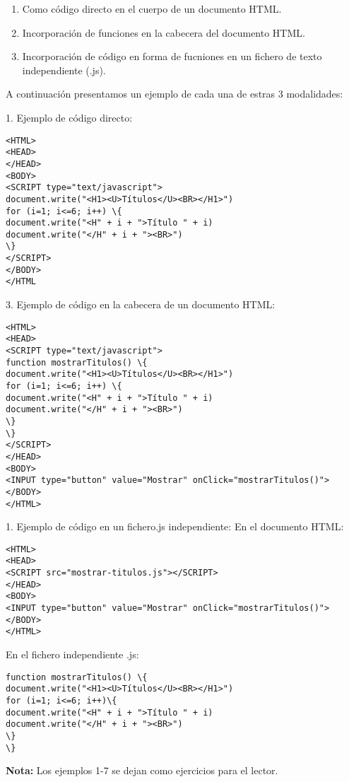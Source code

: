 \documentclass{apuntes}
\begin{document}
\begin{enumerate}
\item Como código directo en el cuerpo de un documento HTML.
\item Incorporación de funciones en la cabecera del documento HTML.
\item Incorporación de código en forma de fucniones en un fichero de texto independiente (.js).
 
\end{enumerate}


A continuación presentamos un ejemplo de cada una de estras 3 modalidades:

1. Ejemplo de código directo:

\begin{verbatim}
<HTML>
<HEAD>
</HEAD>
<BODY>
<SCRIPT type="text/javascript">
document.write("<H1><U>Títulos</U><BR></H1>")
for (i=1; i<=6; i++) \{
document.write("<H" + i + ">Título " + i)
document.write("</H" + i + "><BR>")
\}
</SCRIPT>
</BODY>
</HTML
\end{verbatim}

3. Ejemplo de código en la cabecera de un documento HTML:

\begin{verbatim}
<HTML>
<HEAD>
<SCRIPT type="text/javascript">
function mostrarTitulos() \{
document.write("<H1><U>Títulos</U><BR></H1>")
for (i=1; i<=6; i++) \{
document.write("<H" + i + ">Título " + i)
document.write("</H" + i + "><BR>")
\}
\}
</SCRIPT>
</HEAD>
<BODY>
<INPUT type="button" value="Mostrar" onClick="mostrarTitulos()">
</BODY>
</HTML>
\end{verbatim}

1. Ejemplo de código en un fichero.js independiente:
En el documento HTML:
\begin{verbatim}
<HTML>
<HEAD>
<SCRIPT src="mostrar-titulos.js"></SCRIPT>
</HEAD>
<BODY>
<INPUT type="button" value="Mostrar" onClick="mostrarTitulos()">
</BODY>
</HTML>

\end{verbatim}

En el fichero independiente .js:
\begin{verbatim}
function mostrarTitulos() \{
document.write("<H1><U>Títulos</U><BR></H1>")
for (i=1; i<=6; i++)\{
document.write("<H" + i + ">Título " + i)
document.write("</H" + i + "><BR>")
\}
\}
\end{verbatim}

\textbf{Nota:} Los ejemplos 1-7 se dejan como ejercicios para el lector.
\end{document}
